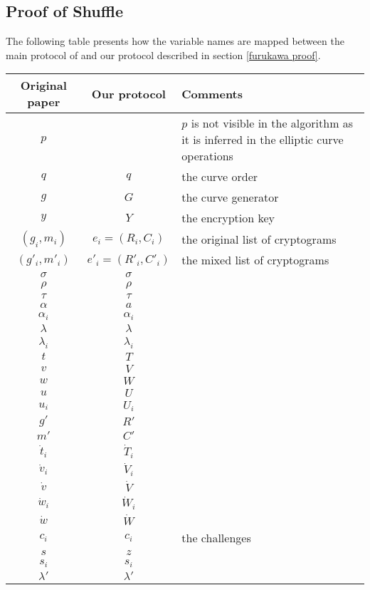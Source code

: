 \subsection{Proof of Shuffle}
The following table presents how the variable names are mapped between the main protocol of \cite{Furukawa01} and our protocol described in section \ref{furukawa proof}.

\begin{center}
    \begin{tabular}{ |c|c|p{6cm}| }
     \hline
     \textbf{Original paper} & \textbf{Our protocol} & \textbf{Comments} \\ 
     \hline
     $p$ & & $p$ is not visible in the algorithm as it is inferred in the elliptic curve operations \\  
     \hline
     $q$ & $q$ & the curve order \\
     \hline
     $g$ & $G$ & the curve generator \\
     \hline
     $y$ & $Y$ & the encryption key \\
     \hline
     $(g_i, m_i)$ & $e_i = (R_i, C_i)$ & the original list of cryptograms \\
     \hline
     $(g'_i, m'_i)$ & $e'_i = (R'_i, C'_i)$ & the mixed list of cryptograms \\
     \hline
     $\sigma$ & $\sigma$ & \\
     \hline
     $\rho$ & $\rho$ & \\
     \hline
     $\tau$ & $\tau$ & \\
     \hline
     $\alpha$ & $a$ & \\
     \hline
     $\alpha_i$ & $\alpha_i$ & \\
     \hline
     $\lambda$ & $\lambda$ & \\
     \hline
     $\lambda_i$ & $\lambda_i$ & \\
     \hline
     $t$ & $T$ & \\
     \hline
     $v$ & $V$ & \\
     \hline
     $w$ & $W$ & \\
     \hline
     $u$ & $U$ & \\
     \hline
     $u_i$ & $U_i$ & \\
     \hline
     $g'$ & $R'$ & \\
     \hline
     $m'$ & $C'$ & \\
     \hline
     $\dot{t}_i$ & $\dot{T}_i$ & \\
     \hline
     $\dot{v}_i$ & $\dot{V}_i$ & \\
     \hline
     $\dot{v}$ & $\dot{V}$ & \\
     \hline
     $\dot{w}_i$ & $\dot{W}_i$ & \\
     \hline
     $\dot{w}$ & $\dot{W}$ & \\
     \hline
     $c_i$ & $c_i$ & the challenges \\
     \hline
     $s$ & $z$ & \\
     \hline
     $s_i$ & $s_i$ & \\
     \hline
     $\lambda'$ & $\lambda'$ & \\
     \hline
    \end{tabular}
\end{center}